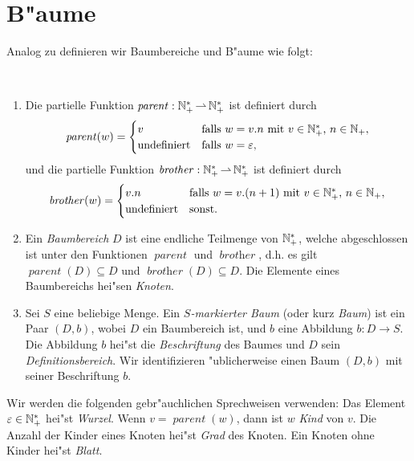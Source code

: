 \documentclass[12pt,a4paper,final]{article}
\DeclareMathOperator{\brother}{\mathit{brother}}
\DeclareMathOperator{\parent}{\mathit{parent}}
\begin{document}

\section{B"aume}
\label{sec:Baeume}

Analog zu
\cite{DBLP:journals/jacm/Rosen73,DBLP:journals/jacm/GoguenTWW77,DBLP:journals/tcs/Courcelle83,DBLP:books/teu/LoeckxMW86}
definieren wir Baumbereiche und B"aume wie folgt:

\begin{definition} \
  \begin{enumerate}
  \item Die partielle Funktion \mbox{$\parent:\N_+^* \pto \N_+^*$} ist definiert durch
    \begin{equation*}
      \parent(w) = 
      \begin{cases}
        v
        & \text{falls $w = v.n$ mit $v \in \N_+^*$, $n \in \N_+$}, \\
        \text{undefiniert}
        & \text{falls $w = \varepsilon$},
      \end{cases}
    \end{equation*}
    und die partielle Funktion \mbox{$\brother:\N_+^* \pto \N_+^*$} ist definiert durch
    \begin{equation*}
      \brother(w) =
      \begin{cases}
        v.n
        & \text{falls $w = v.(n+1)$ mit $v \in \N_+^*$, $n \in \N_+$}, \\
        \text{undefiniert}
        & \text{sonst}.
      \end{cases}
    \end{equation*}

  \item Ein \emph{Baumbereich} $D$ ist eine endliche Teilmenge von $\mathbb N_+^*$, welche
    abgeschlossen ist unter den Funktionen $\parent$ und $\brother$, d.h. es gilt
    \mbox{$\parent(D) \subseteq D$} und \mbox{$\brother(D) \subseteq D$}.
    Die Elemente eines Baumbereichs hei"sen \emph{Knoten}.

  \item Sei $S$ eine beliebige Menge. Ein \emph{$S$-markierter Baum} (oder kurz \emph{Baum})
    ist ein Paar \mbox{$(D,b)$}, wobei $D$ ein Baumbereich ist, und $b$ eine Abbildung
    \mbox{$b:D \to S$}. Die Abbildung $b$ hei"st die \emph{Beschriftung} des
    Baumes und $D$ sein \emph{Definitionsbereich}.
    Wir identifizieren "ublicherweise einen Baum $(D,b)$ mit seiner Beschriftung $b$.
  \end{enumerate}
\end{definition}
Wir werden die folgenden gebr"auchlichen Sprechweisen verwenden: Das Element
\mbox{$\varepsilon \in \mathbb N_+^*$} hei"st \emph{Wurzel}. Wenn $v = \parent(w)$, dann
ist $w$ \emph{Kind} von $v$. Die Anzahl der Kinder eines Knoten hei"st
\emph{Grad} des Knoten. Ein Knoten ohne Kinder hei"st \emph{Blatt}.
\end{document}
